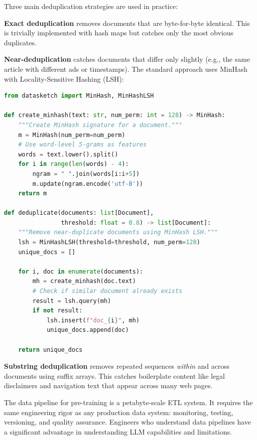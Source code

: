 Three main deduplication strategies are used in practice:

\textbf{Exact deduplication} removes documents that are byte-for-byte identical. This is trivially implemented with hash maps but catches only the most obvious duplicates.

\textbf{Near-deduplication} catches documents that differ only slightly (e.g., the same article with different ads or timestamps). The standard approach uses MinHash with Locality-Sensitive Hashing (LSH):

\begin{lstlisting}[language=Python, caption={MinHash-based near-deduplication (simplified)}]
from datasketch import MinHash, MinHashLSH

def create_minhash(text: str, num_perm: int = 128) -> MinHash:
    """Create MinHash signature for a document."""
    m = MinHash(num_perm=num_perm)
    # Use word-level 5-grams as features
    words = text.lower().split()
    for i in range(len(words) - 4):
        ngram = " ".join(words[i:i+5])
        m.update(ngram.encode('utf-8'))
    return m

def deduplicate(documents: list[Document], 
                threshold: float = 0.8) -> list[Document]:
    """Remove near-duplicate documents using MinHash LSH."""
    lsh = MinHashLSH(threshold=threshold, num_perm=128)
    unique_docs = []
    
    for i, doc in enumerate(documents):
        mh = create_minhash(doc.text)
        # Check if similar document already exists
        result = lsh.query(mh)
        if not result:
            lsh.insert(f"doc_{i}", mh)
            unique_docs.append(doc)
    
    return unique_docs
\end{lstlisting}

\textbf{Substring deduplication} removes repeated sequences \emph{within} and across documents using suffix arrays. This catches boilerplate content like legal disclaimers and navigation text that appear across many web pages.

\begin{keytakeaway}
The data pipeline for pre-training is a petabyte-scale ETL system. It requires the same engineering rigor as any production data system: monitoring, testing, versioning, and quality assurance. Engineers who understand data pipelines have a significant advantage in understanding LLM capabilities and limitations.
\end{keytakeaway}

